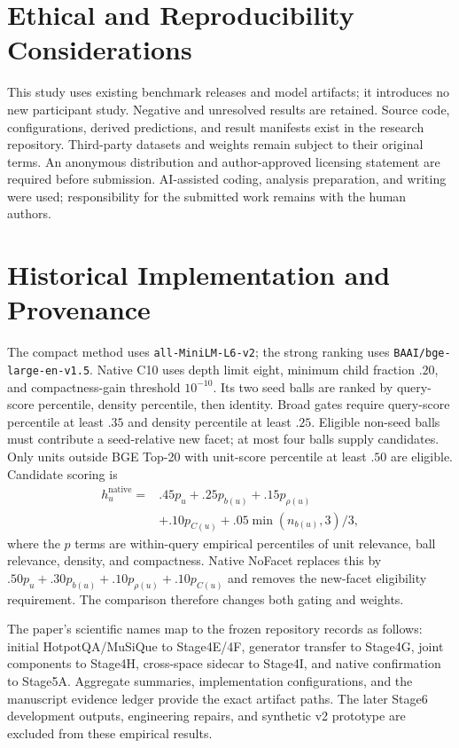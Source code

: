 \documentclass[11pt]{article}
\begin{document}
\section*{Ethical and Reproducibility Considerations}
This study uses existing benchmark releases and model artifacts; it introduces
no new participant study. Negative and unresolved results are retained.
Source code, configurations, derived predictions, and result manifests exist
in the research repository. Third-party datasets and weights remain subject
to their original terms. An anonymous distribution and author-approved
licensing statement are required before submission. AI-assisted coding,
analysis preparation, and writing were used; responsibility for the submitted
work remains with the human authors.


\appendix
\section{Historical Implementation and Provenance}
\label{app:native}
The compact method uses \texttt{all-MiniLM-L6-v2}; the strong ranking uses
\texttt{BAAI/bge-large-en-v1.5}. Native C10 uses depth limit eight,
minimum child fraction $.20$, and compactness-gain threshold $10^{-10}$.
Its two seed balls are ranked by query-score percentile, density percentile,
then identity. Broad gates require query-score percentile at least $.35$ and
density percentile at least $.25$. Eligible non-seed balls must contribute a
seed-relative new facet; at most four balls supply candidates.
Only units outside BGE Top-20 with unit-score percentile at least $.50$ are
eligible. Candidate scoring is
\begin{equation}
\begin{split}
h_u^{\mathrm{native}}={}&.45p_u+.25p_{b(u)}+.15p_{\rho(u)}\\
&+.10p_{C(u)}+.05\min(n_{b(u)},3)/3 ,
\end{split}
\end{equation}
where the $p$ terms are within-query empirical percentiles of unit relevance,
ball relevance, density, and compactness. Native NoFacet replaces this by
$.50p_u+.30p_{b(u)}+.10p_{\rho(u)}+.10p_{C(u)}$ and removes the new-facet
eligibility requirement. The comparison therefore changes both gating and
weights.

The paper's scientific names map to the frozen repository records as follows:
initial HotpotQA/MuSiQue to Stage4E/4F, generator transfer to Stage4G,
joint components to Stage4H, cross-space sidecar to Stage4I, and native
confirmation to Stage5A. Aggregate summaries, implementation configurations,
and the manuscript evidence ledger provide the exact artifact paths.
The later Stage6 development outputs, engineering repairs, and synthetic v2
prototype are excluded from these empirical results.
\end{document}

